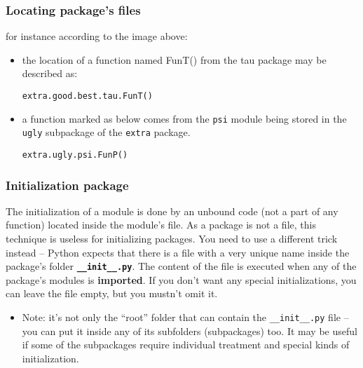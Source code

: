 \documentclass[11pt]{article}
\begin{document}
\subsubsection{Locating package's files}
\label{sec:orgbde34f3}
for instance according to the image above:
\begin{itemize}
\item the location of a function named FunT() from the tau package may be
described as:

\texttt{extra.good.best.tau.FunT()}

\item a function marked as below comes from the \texttt{psi} module being stored in
the \texttt{ugly} subpackage of the \texttt{extra} package.

\texttt{extra.ugly.psi.FunP()}
\end{itemize}


\subsubsection{Initialization package}
\label{sec:orgbfd2bc0}
The initialization of a module is done by an unbound code (not a part
of any function) located inside the module’s file. As a package is not
a file, this technique is useless for initializing packages. You need
to use a different trick instead – Python expects that there is a file
with a very unique name inside the package’s folder \textbf{\texttt{\_\_init\_\_.py}}.
The content of the file is executed when any of the package’s modules
is \textbf{imported}. If you don’t want any special initializations, you can
leave the file empty, but you mustn’t omit it.


\begin{itemize}
\item Note: it’s not only the “root” folder that can contain the
\texttt{\_\_init\_\_.py} file – you can put it inside any of its subfolders
(subpackages) too. It may be useful if some of the subpackages require
individual treatment and special kinds of initialization.
\end{itemize}
\end{document}
